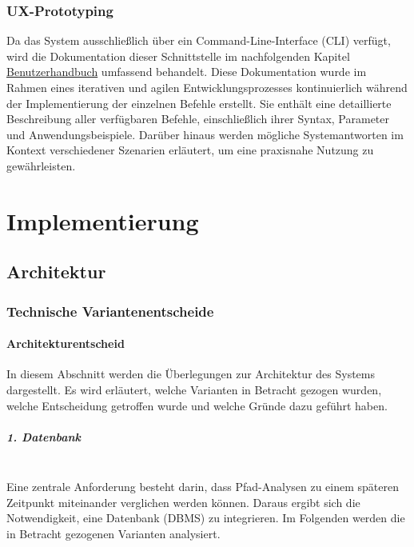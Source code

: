 \documentclass[a4paper,12pt]{report}
\begin{document}
    \newpage

    \subsection{UX-Prototyping}
    Da das System ausschließlich über ein Command-Line-Interface (CLI) verfügt,
    wird die Dokumentation dieser Schnittstelle im nachfolgenden Kapitel \hyperref[sec:user-manual]{Benutzerhandbuch}
    umfassend behandelt.
    Diese Dokumentation wurde im Rahmen eines iterativen und agilen Entwicklungsprozesses
    kontinuierlich während der Implementierung der einzelnen Befehle erstellt.
    Sie enthält eine detaillierte Beschreibung aller verfügbaren Befehle, einschließlich ihrer Syntax, Parameter und Anwendungsbeispiele.
    Darüber hinaus werden mögliche Systemantworten im Kontext verschiedener Szenarien erläutert,
    um eine praxisnahe Nutzung zu gewährleisten.


    \chapter{Implementierung}


    \section{Architektur}

    \subsection{Technische Variantenentscheide}

    \subsubsection{Architekturentscheid}
    In diesem Abschnitt werden die Überlegungen zur Architektur des Systems dargestellt.
    Es wird erläutert, welche Varianten in Betracht gezogen wurden, welche Entscheidung getroffen wurde und welche Gründe dazu geführt haben.

    \paragraph{1. Datenbank}\mbox{}\\
    Eine zentrale Anforderung besteht darin, dass Pfad-Analysen zu einem späteren Zeitpunkt miteinander verglichen werden können.
    Daraus ergibt sich die Notwendigkeit, eine Datenbank (DBMS) zu integrieren.
    Im Folgenden werden die in Betracht gezogenen Varianten analysiert.
\end{document}
